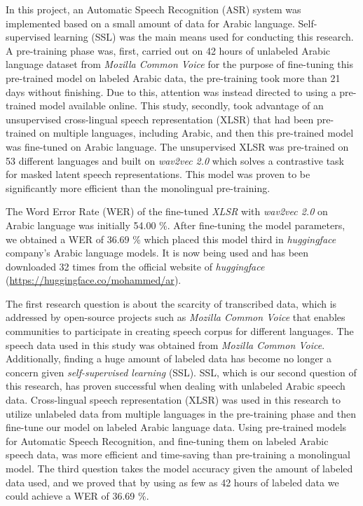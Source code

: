 \documentclass[
  a4paper,
]{article}
\begin{document}
In this project, an Automatic Speech Recognition (ASR) system was
implemented based on a small amount of data for Arabic language.
Self-supervised learning (SSL) was the main means used for conducting
this research. A pre-training phase was, first, carried out on 42 hours
of unlabeled Arabic language dataset from \emph{Mozilla Common Voice}
for the purpose of fine-tuning this pre-trained model on labeled Arabic
data, the pre-training took more than 21 days without finishing. Due to
this, attention was instead directed to using a pre-trained model
available online. This study, secondly, took advantage of an
unsupervised cross-lingual speech representation (XLSR) that had been
pre-trained on multiple languages, including Arabic, and then this
pre-trained model was fine-tuned on Arabic language. The unsupervised
XLSR was pre-trained on 53 different languages and built on
\emph{wav2vec 2.0} which solves a contrastive task for masked latent
speech representations. This model was proven to be significantly more
efficient than the monolingual pre-training.

The Word Error Rate (WER) of the fine-tuned \emph{XLSR} with
\emph{wav2vec 2.0} on Arabic language was initially 54.00 \%. After
fine-tuning the model parameters, we obtained a WER of 36.69 \% which
placed this model third in \emph{huggingface} company's Arabic language
models. It is now being used and has been downloaded 32 times from the
official website of \emph{huggingface}
(\url{https://huggingface.co/mohammed/ar}).

The first research question is about the scarcity of transcribed data,
which is addressed by open-source projects such as \emph{Mozilla Common
Voice} that enables communities to participate in creating speech corpus
for different languages. The speech data used in this study was obtained
from \emph{Mozilla Common Voice}. Additionally, finding a huge amount of
labeled data has become no longer a concern given \emph{self-supervised
learning} (SSL). SSL, which is our second question of this research, has
proven successful when dealing with unlabeled Arabic speech data.
Cross-lingual speech representation (XLSR) was used in this research to
utilize unlabeled data from multiple languages in the pre-training phase
and then fine-tune our model on labeled Arabic language data. Using
pre-trained models for Automatic Speech Recognition, and fine-tuning
them on labeled Arabic speech data, was more efficient and time-saving
than pre-training a monolingual model. The third question takes the
model accuracy given the amount of labeled data used, and we proved that
by using as few as 42 hours of labeled data we could achieve a WER of
36.69 \%.
\end{document}
